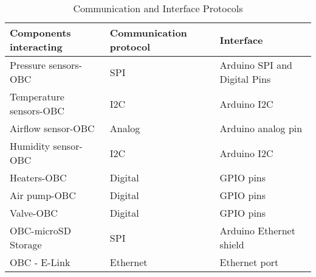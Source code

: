 \begin{table}[H]
\centering
\begin{tabular}{lll}
\textbf{Components interacting} & \textbf{Communication protocol} & \textbf{Interface}                 \\ \hline
Pressure sensors-OBC   & SPI                    & Arduino SPI and Digital Pins \\
Temperature sensors-OBC        & I2C                    & Arduino I2C \\
Airflow sensor-OBC     & Analog                    & Arduino analog pin \\
Humidity sensor-OBC            & I2C                & Arduino I2C \\
Heaters-OBC            & Digital                & GPIO pins \\
Air pump-OBC           & Digital                & GPIO pins \\
Valve-OBC              & Digital                & GPIO pins                 \\
OBC-microSD Storage    & SPI                    & Arduino Ethernet shield   \\
OBC - E-Link           & Ethernet               & Ethernet port            
\end{tabular}%
\caption{Communication and Interface Protocols}
\label{tab:comIntpro}
\end{table}